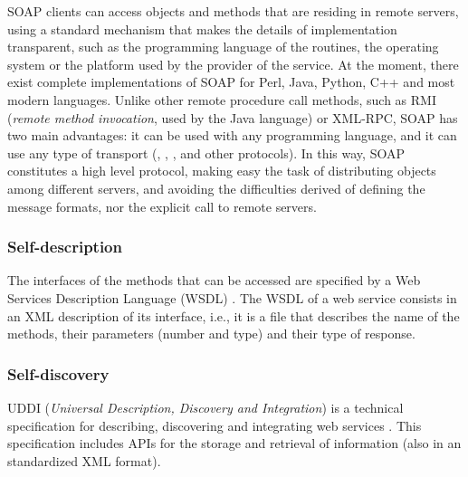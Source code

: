 SOAP clients can access objects and methods that are residing in
remote servers, using a standard mechanism that makes  the details of
implementation transparent, such as the programming language of the
routines, the operating system or the platform used by the provider of
the service. %
At the moment, there exist complete implementations of SOAP for Perl, Java, Python, C++ and most modern languages.
Unlike other remote procedure call methods, such as RMI (\emph{remote method invocation}, used by the Java language) or XML-RPC, SOAP has two main advantages: it can be used with any programming language, and it can use any type of transport (, , ,  and other protocols). In this way, SOAP constitutes a high level protocol, making easy the task of distributing objects among different servers, and avoiding the difficulties derived of defining the message formats, nor the explicit call to remote servers.


\subsubsection{Self-description} The interfaces of the methods that can be accessed are specified by a Web Services Description Language (WSDL) \cite{WSDL}. The WSDL of a web service consists in an XML description of its interface, i.e., it is a file that describes the name of the methods, their parameters (number and type) and their type of response.

\subsubsection{Self-discovery} UDDI ({\em Universal Description, Discovery and Integration}) \cite{UDDI} is a technical specification for describing, discovering and integrating web services \cite{Cerami2002Webservices}. This specification includes APIs for the storage and retrieval of information (also in an standardized XML format).


